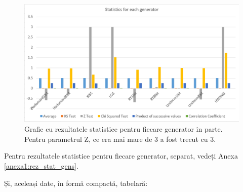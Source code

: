 \begin{figure}[H]
    \centering
    \includegraphics[width=1.0\textwidth]{continut/capitol4/figuri/ExcelStats.png}
    \caption{Grafic cu rezultatele statistice pentru fiecare generator in parte. Pentru parametrul Z, ce era mai mare de 3 a fost trecut cu 3.}
    \label{fig:AllGensExcel}
\end{figure}
Pentru rezultatele statistice pentru fiecare generator, separat, vedeți Anexa \ref{anexa1:rez_stat_gens}.

Și, aceleași date, în formă compactă, tabelară:



